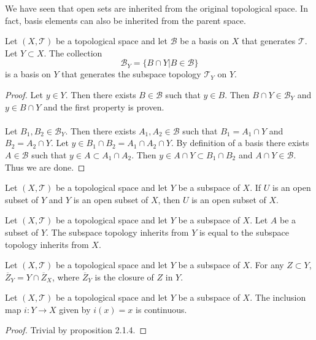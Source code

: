 \documentclass[a4paper]{article}
\begin{document}
We have seen that open sets are inherited from the original topological space. In fact, basis elements can also be inherited from the parent space. 

\begin{prp}{}{} Let $(X,\mathcal{T})$ be a topological space and let $\mathcal{B}$ be a basis on $X$ that generates $\mathcal{T}$. Let $Y\subset X$. The collection $$\mathcal{B}_Y=\{B\cap Y|B\in\mathcal{B}\}$$ is a basis on $Y$ that generates the subspace topology $\mathcal{T}_Y$ on $Y$. \tcbline
\begin{proof}
Let $y\in Y$. Then there exists $B\in\mathcal{B}$ such that $y\in B$. Then $B\cap Y\in\mathcal{B}_Y$ and $y\in B\cap Y$ and the first property is proven. \\~\\
Let $B_1,B_2\in\mathcal{B}_Y$. Then there exists $A_1,A_2\in\mathcal{B}$ such that $B_1=A_1\cap Y$ and $B_2=A_2\cap Y$.  Let $y\in B_1\cap B_2=A_1\cap A_2\cap Y$. By definition of a basis there exists $A\in\mathcal{B}$ such that $y\in A\subset A_1\cap A_2$. Then $y\in A\cap Y\subset B_1\cap B_2$ and $A\cap Y\in\mathcal{B}$. Thus we are done. 
\end{proof}
\end{prp}

\begin{prp}{}{} Let $(X,\mathcal{T})$ be a topological space and let $Y$ be a subspace of $X$. If $U$ is an open subset of $Y$ and $Y$ is an open subset of $X$, then $U$ is an open subset of $X$. 
\end{prp}

\begin{prp}{}{} Let $(X,\mathcal{T})$ be a topological space and let $Y$ be a subspace of $X$. Let $A$ be a subset of $Y$. The subspace topology inherits from $Y$ is equal to the subspace topology inherits from $X$. 
\end{prp}

\begin{prp}{}{} Let $(X,\mathcal{T})$ be a topological space and let $Y$ be a subspace of $X$. For any $Z\subset Y$, $\overline{Z}_Y=Y\cap\overline{Z}_X$, where $\overline{Z}_Y$ is the closure of $Z$ in $Y$. 
\end{prp}

\begin{prp}{}{} Let $(X,\mathcal{T})$ be a topological space and let $Y$ be a subspace of $X$. The inclusion map $i:Y\to X$ given by $i(x)=x$ is continuous. \tcbline
\begin{proof}
Trivial by proposition 2.1.4. 
\end{proof}
\end{prp}
\end{document}
